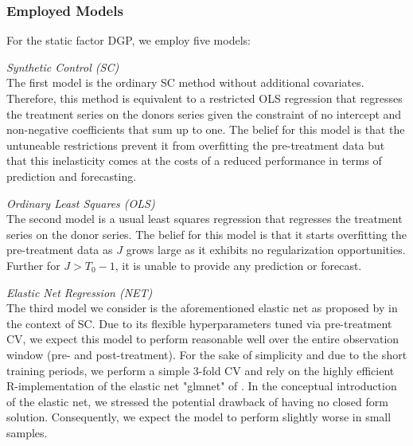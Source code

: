 \subsubsection{Employed Models}
For the static factor \ac{DGP}, we employ five models: 

\textit{Synthetic Control (SC)}\\
The first model is the ordinary \ac{SC} method without additional covariates. Therefore, this method is equivalent to a restricted \ac{OLS} regression that regresses the treatment series on the donors series given the constraint of no intercept and non-negative coefficients that sum up to one. The belief for this model is that the untuneable restrictions prevent it from overfitting the pre-treatment data but that this inelasticity comes at the costs of a reduced performance in terms of prediction and forecasting.

\textit{Ordinary Least Squares (OLS)}\\
The second model is a usual least squares regression that regresses the treatment series on the donor series. The belief for this model is that it starts overfitting the pre-treatment data as $J$ grows large as it exhibits no regularization opportunities. Further for $J > T_0 -1$, it is unable to provide any prediction or forecast.

\textit{Elastic Net Regression (NET)}\\
The third model we consider is the aforementioned elastic net as proposed by \cite{doudchenko:2016} in the context of \ac{SC}. Due to its flexible hyperparameters tuned via pre-treatment \ac{CV}, we expect this model to perform reasonable well over the entire observation window (pre- and post-treatment). For the sake of simplicity and due to the short training periods, we perform a simple 3-fold \ac{CV} and rely on the highly efficient R-implementation of the elastic net "glmnet" of \cite{friedman:2010}. In the conceptual introduction of the elastic net, we stressed the potential drawback of having no closed form solution. Consequently, we expect the model to perform slightly worse in small samples.

